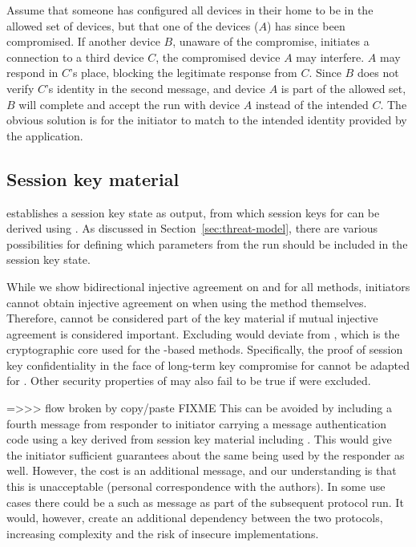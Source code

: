 \documentclass[runningheads, envcountsame, a4paper, draft, x11names]{llncs}
\newcommand{\spacehack}{\vspace{-1em}}
\newcommand{\fillhack}{\vspace{-0.5em}}
\begin{document}
Assume that someone has configured all devices in their home to be in the
allowed set of devices, but that one of the devices ($A$) has since been
compromised.
%
If another device $B$, unaware of the compromise, initiates a connection to a
third device $C$, the compromised device $A$ may interfere.
%
$A$ may respond in $C$'s place, blocking the legitimate response from $C$.
%
Since $B$ does not verify $C$'s identity in the second message, and device $A$
is part of the allowed set, $B$ will complete and accept the \mEdhoc{} run
with device $A$ instead of the intended $C$.
%
The obvious solution is for the initiator to match \mIdcredr{} to the intended
identity provided by the application.


\spacehack
\subsection{Session key material}
\label{sec:sessionKeyMaterial}
\fillhack
\mEdhoc{} establishes a session key state as output, from which session keys
for \mOscore{} can be derived using \mHkdf{}.
%
As discussed in Section~\ref{sec:threat-model}, there are various possibilities
for defining which parameters from the \mEdhoc{} run should be included in the
session key state.
%

While we show bidirectional injective agreement on \mGx{} and \mGy{}
for all methods, initiators cannot obtain injective agreement on \mGiy{} when
using the \mStat{} method themselves. Therefore, \mGiy{} cannot be considered
part of the key material if mutual injective agreement is considered important.
%
Excluding \mGiy{} would deviate from \mOptls{}, which is the cryptographic core
used for the \mStat-based methods. Specifically, the proof of session key
confidentiality in the face of long-term key compromise for \mOptls{} cannot be
adapted for \mEdhoc{}.
%
Other security properties of \mOptls{} may also fail to be true if
\mGiy{} were excluded. 
%

=>>> flow broken by copy/paste FIXME
This can be avoided by including a fourth message from responder to initiator
carrying a message authentication code using a key derived from session key
material including \mGiy{}.
%
This would give the initiator sufficient guarantees about the same \mGiy{}
being used by the responder as well.
%
However, the cost is an additional message, and our understanding is that this
is unacceptable (personal correspondence with the \mSpec{} authors).
%
In some use cases there could be a such as message as part of
the subsequent \mOscore{} protocol run. It would, however, create an additional
dependency between the two protocols, increasing complexity and the risk of
insecure implementations.
%
\end{document}
